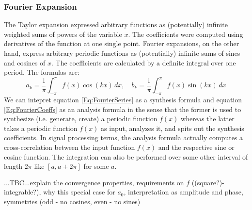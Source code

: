 

\subsubsection{Fourier Expansion}
The Taylor expansion expressed arbitrary functions as (potentially) infinite weighted sums of powers of the variable $x$. The coefficients were computed using derivatives of the function at one single point. Fourier expansions, on the other hand, express arbitrary periodic functions as (potentially) infinite sums of sines and cosines of $x$. The coefficients are calculated by a definite integral over one period. The formulas are:
\begin{equation}
\label{Eq:FourierCoeffs}	
 a_k = \frac{1}{\pi} \int_{-\pi}^{\pi} f(x) \cos(k x) \, dx, \quad
 b_k = \frac{1}{\pi} \int_{-\pi}^{\pi} f(x) \sin(k x) \, dx 
\end{equation}
We can intepret equation \ref{Eq:FourierSeries} as a synthesis formula and equation \ref{Eq:FourierCoeffs} as an analysis formula in the sense that the former is used to synthesize (i.e. generate, create) a periodic function $f(x)$ whereas the latter takes a periodic function $f(x)$ as input, analyzes it, and spits out the synthesis coefficients. In signal processing terms,  the analysis formula actually computes a cross-correlation between the input function $f(x)$ and the respective sine or cosine function. The integration can also be performed over some other interval of length $2\pi$ like $[a,a+2\pi]$ for some $a$. 

\medskip
...TBC...explain the convergence properties, requirements on $f$ ((square?)-integrable?), why this special case for $a_0$, interpretation as amplitude and phase, symmetries (odd - no cosines, even - no sines)

